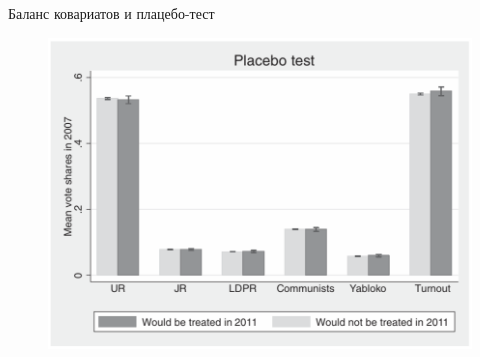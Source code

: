 \begin{frame}{Баланс ковариатов и плацебо-тест}
\begin{figure}
    \centering
    \includegraphics[width=\textwidth]{Images/placebo_test.png}
    \label{fig:my_label}
    
\end{figure}
\end{frame}





